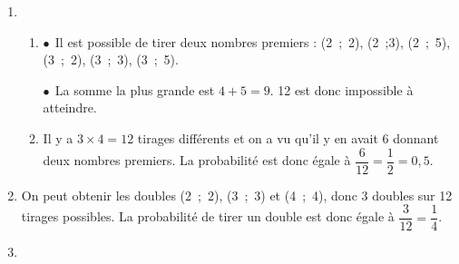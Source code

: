 \documentclass[10pt]{article}
\begin{document}
\begin{enumerate}
\item %

	\begin{enumerate}
		\item %
$\bullet~~$Il est possible de tirer deux nombres premiers : (2~;~2), (2~;3), (2~;~5), (3~;~2), (3~;~3), (3~;~5).

$\bullet~~$La somme la plus grande est $4 + 5 = 9$. 12 est donc impossible à atteindre.
		\item %
Il y a $3 \times 4 = 12$ tirages différents et on a vu qu'il y en avait 6 donnant deux nombres premiers. La probabilité est donc égale à $\dfrac{6}{12} = \dfrac{1}{2} = 0,5$.
	\end{enumerate}
\item %

On peut obtenir les doubles (2~;~2), (3~;~3) et (4~;~4), donc 3 doubles sur 12 tirages possibles. La probabilité de tirer un double est donc égale à $\dfrac{3}{12} = \dfrac{1}{4}$.
\item %




\end{enumerate}
\end{document}
